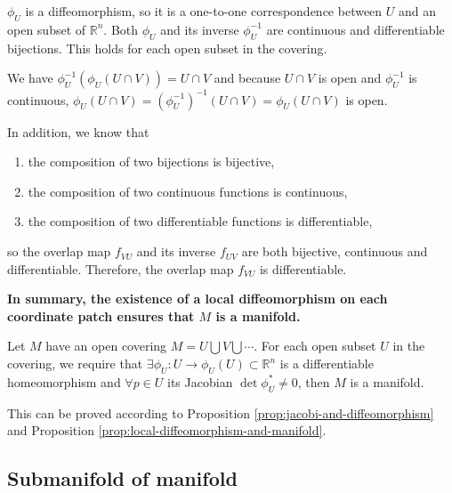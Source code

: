 \documentclass[11pt, a4paper]{book}
\begin{document}
\begin{Proof}
  $\phi_U$ is a diffeomorphism, so it is a one-to-one correspondence between $U$ and an
  open subset of $\mathbb{R}^n$. Both $\phi_U$ and its inverse $\phi_U^{-1}$ are
  continuous and differentiable bijections. This holds for each open subset in the
  covering.

  We have $\phi_U^{-1}(\phi_U(U \cap V)) = U \cap V$ and because $U \cap V$ is open and
  $\phi_U^{-1}$ is continuous,
  $\phi_U(U \cap V)=(\phi_U^{-1})^{-1}(U \cap V) = \phi_U(U \cap V)$ is open.
  
  In addition, we know that
  \begin{enumerate}
  \item the composition of two bijections is bijective,
  \item the composition of two continuous functions is continuous,
  \item the composition of two differentiable functions is differentiable,
  \end{enumerate}
  so the overlap map $f_{VU}$ and its inverse $f_{UV}$ are both bijective, continuous and
  differentiable. Therefore, the overlap map $f_{VU}$ is differentiable.

  \textbf{In summary, the existence of a local diffeomorphism on each coordinate patch
    ensures that $M$ is a manifold.}
\end{Proof}

\begin{Proposition}
  Let $M$ have an open covering $M=U \bigcup V \bigcup \cdots$. For each open subset $U$
  in the covering, we require that
  $\exists \phi_U: U \rightarrow \phi_U(U) \subset \mathbb{R}^n$ is a differentiable
  homeomorphism and $\forall p \in U$ its Jacobian $\det{\phi_U^{*}} \neq 0$, then $M$ is
  a manifold.
\end{Proposition}

\begin{Proof}
  This can be proved according to Proposition \ref{prop:jacobi-and-diffeomorphism} and
  Proposition \ref{prop:local-diffeomorphism-and-manifold}.
\end{Proof}


\subsection{Submanifold of manifold}
\end{document}
